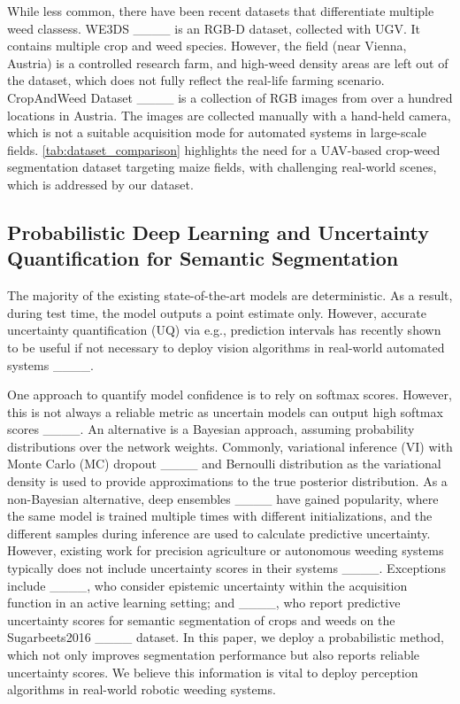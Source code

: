 While less common, there have been recent datasets that differentiate multiple weed classess. WE3DS ____ is an RGB-D dataset, collected with  UGV.
It contains multiple crop and weed species. However, the field (near Vienna, Austria) is a controlled research farm, and high-weed density areas are left out of the dataset, which does not fully reflect the real-life farming scenario.
CropAndWeed Dataset ____ is a collection of RGB images from over a hundred locations in Austria.
The images are collected manually with a hand-held camera, which is not a suitable acquisition mode for automated systems in large-scale fields. \cref{tab:dataset_comparison} highlights the need for a UAV-based crop-weed segmentation dataset targeting maize fields, with challenging real-world scenes, which is addressed by our dataset.








\subsection{Probabilistic Deep Learning and Uncertainty Quantification for Semantic Segmentation}
\label{sec:probabilistic_dl}
The majority of the existing state-of-the-art models are deterministic. As a result, during test time, the model outputs a point estimate only. However, accurate uncertainty quantification (UQ) via e.g., prediction intervals has recently shown to be useful if not necessary to deploy vision algorithms in real-world automated systems ____.

One approach to quantify model confidence is to rely on softmax scores.
However, this is not always a reliable metric as uncertain models can output high softmax scores ____.
An alternative is a Bayesian approach, assuming probability distributions over the network weights.
Commonly, variational inference (VI) with Monte Carlo (MC) dropout ____ and Bernoulli distribution as the variational density is used to provide approximations to the true posterior distribution.
As a non-Bayesian alternative, deep ensembles ____ have gained popularity, where the same model is trained multiple times with different initializations, and the different samples during inference are used to calculate predictive uncertainty. However, existing work for precision agriculture or autonomous weeding systems typically does not include uncertainty scores in their systems ____.
Exceptions include ____, who consider epistemic uncertainty within the acquisition function in an active learning setting; and ____, who report predictive uncertainty scores for semantic segmentation of crops and weeds on the Sugarbeets2016 ____ dataset.
In this paper, we deploy a probabilistic method, which not only improves segmentation performance but also reports reliable uncertainty scores.
We believe this information is vital to deploy perception algorithms in real-world robotic weeding systems.